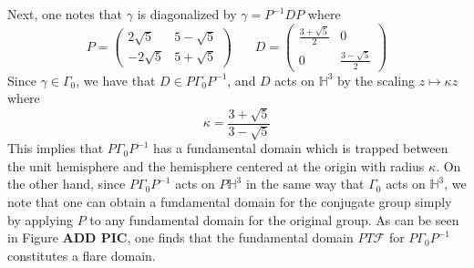 \documentclass[]{article}
\begin{document}
Next, one notes that $\gamma$ is diagonalized by $\gamma = P^{-1}DP$ where
$$
P =
\begin{pmatrix}
	2\sqrt{5} & 5 - \sqrt{5} \\
	-2\sqrt{5} & 5 + \sqrt{5}
\end{pmatrix} ~~~~~~~~
D =
\begin{pmatrix}
	\frac{3 + \sqrt{5}}{2} & 0 \\
	0 & \frac{3 - \sqrt{5}}{2}
\end{pmatrix}
$$
Since $\gamma \in \Gamma_0$, we have that $D \in P\Gamma_0P^{-1}$, and $D$ acts on $\mathbb{H}^3$ by the scaling $z \mapsto \kappa z$ where
$$
\kappa = \frac{3 + \sqrt{5}}{3 - \sqrt{5}}
$$
This implies that $P\Gamma_0P^{-1}$ has a fundamental domain which is trapped between the unit hemisphere and the hemisphere centered at the origin with radius $\kappa$.
On the other hand, since $P\Gamma_0P^{-1}$ acts on $P\mathbb{H}^3$ in the same way that $\Gamma_0$ acts on $\mathbb{H}^3$, we note that one can obtain a fundamental domain for the conjugate group simply by applying $P$ to any fundamental domain for the original group.
As can be seen in Figure \textbf{ADD PIC}, one finds that the fundamental domain $PT\mathcal{F}$ for $P\Gamma_0P^{-1}$ constitutes a flare domain.

\pagebreak

\printbibliography
\end{document}
